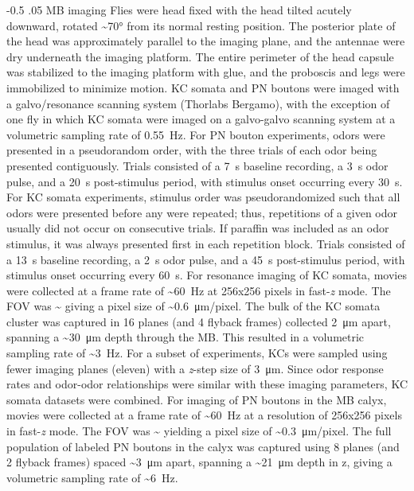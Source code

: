 \documentclass[12pt]{caltech_thesis}
\makeatletter
\let\Oldsubsubsection\subsubsection
\renewcommand{\subsubsection}{\FloatBarrier\Oldsubsubsection}
\renewcommand\subsubsection{%
    \@startsection{subsubsection}{4}{0mm}%
       {-0.5\baselineskip}%
       {.05\baselineskip}%
       {\normalfont\normalsize\bfseries\itshape}}
\makeatother
\begin{document}
\begin{refsection}
\subsubsection{MB imaging}
Flies were head fixed with the head tilted acutely downward, rotated \textasciitilde\ang{70} from its normal resting position.
The posterior plate of the head was approximately parallel to the imaging plane, and the antennae were dry underneath the imaging platform.
The entire perimeter of the head capsule was stabilized to the imaging platform with glue, and the proboscis and legs were immobilized to minimize motion.
KC somata and PN boutons were imaged with a galvo/resonance scanning system (Thorlabs Bergamo), with the exception of one fly in which KC somata were imaged on a galvo-galvo scanning system at a volumetric sampling rate of \qty{0.55}{\hertz}.
For PN bouton experiments, odors were presented in a pseudorandom order, with the three trials of each odor being presented contiguously.
Trials consisted of a \qty{7}{\second} baseline recording, a \qty{3}{\second} odor pulse, and a \qty{20}{\second} post-stimulus period, with stimulus onset occurring every \qty{30}{\second}.
For KC somata experiments, stimulus order was pseudorandomized such that all odors were presented before any were repeated; thus, repetitions of a given odor usually did not occur on consecutive trials.
If paraffin was included as an odor stimulus, it was always presented first in each repetition block.
Trials consisted of a \qty{13}{\second} baseline recording, a \qty{2}{\second} odor pulse, and a \qty{45}{\second} post-stimulus period, with stimulus onset occurring every \qty{60}{\second}.
For resonance imaging of KC somata, movies were collected at a frame rate of \textasciitilde\qty{60}{\hertz} at 256x256 pixels in fast-\textit{z} mode.
The FOV was \textasciitilde{} giving a pixel size of \textasciitilde\qty{0.6}{\micro\metre}/pixel.
The bulk of the KC somata cluster was captured in 16 planes (and 4 flyback frames) collected \qty{2}{\micro\metre} apart, spanning a \textasciitilde\qty{30}{\micro\metre} depth through the MB.
This resulted in a volumetric sampling rate of \textasciitilde\qty{3}{\hertz}.
For a subset of experiments, KCs were sampled using fewer imaging planes (eleven) with a \textit{z}-step size of \qty{3}{\micro\metre}.
Since odor response rates and odor-odor relationships were similar with these imaging parameters, KC somata datasets were combined.
For imaging of PN boutons in the MB calyx, movies were collected at a frame rate of \textasciitilde\qty{60}{\hertz} at a resolution of 256x256 pixels in fast-\textit{z} mode.
The FOV was \textasciitilde{} yielding a pixel size of \textasciitilde\qty{0.3}{\micro\metre}/pixel.
The full population of labeled PN boutons in the calyx was captured using 8 planes (and 2 flyback frames) spaced \textasciitilde\qty{3}{\micro\metre} apart, spanning a \textasciitilde\qty{21}{\micro\metre} depth in z, giving a volumetric sampling rate of \textasciitilde\qty{6}{\hertz}.\\


\end{refsection}
\end{document}
